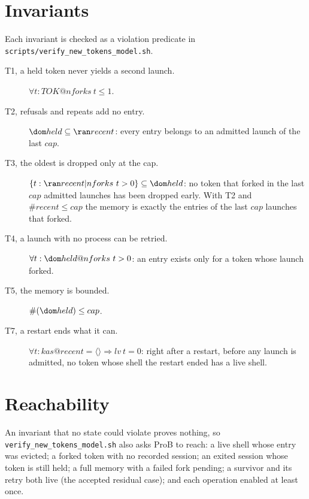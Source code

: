 \documentclass[a4paper,10pt,fleqn]{article}
\begin{document}
\section{Invariants}

Each invariant is checked as a violation predicate in
\texttt{scripts/verify\_new\_tokens\_model.sh}.

\begin{description}
  \item[T1, a held token never yields a second launch.]
    $\forall t : TOK @ nforks~t \leq 1$.
  \item[T2, refusals and repeats add no entry.]
    $\dom held \subseteq \ran recent$: every entry belongs to an admitted
    launch of the last $cap$.
  \item[T3, the oldest is dropped only at the cap.]
    $\{ t : \ran recent | nforks~t > 0 \} \subseteq \dom held$: no token that
    forked in the last $cap$ admitted launches has been dropped early.  With T2
    and $\# recent \leq cap$ the memory is exactly the entries of the last
    $cap$ launches that forked.
  \item[T4, a launch with no process can be retried.]
    $\forall t : \dom held @ nforks~t > 0$: an entry exists only for a token
    whose launch forked.
  \item[T5, the memory is bounded.] $\# (\dom held) \leq cap$.
  \item[T7, a restart ends what it can.] $\forall t : kas @ recent = \langle \rangle \Rightarrow lv~t = 0$: right after a restart, before any launch is admitted, no token whose shell the restart ended has a live shell.
\end{description}

\section{Reachability}

An invariant that no state could violate proves nothing, so
\texttt{verify\_new\_tokens\_model.sh} also asks ProB to reach: a live shell
whose entry was evicted; a forked token with no recorded session; an exited
session whose token is still held; a full memory with a failed fork pending;
a survivor and its retry both live (the accepted residual case); and each
operation enabled at least once.
\end{document}
